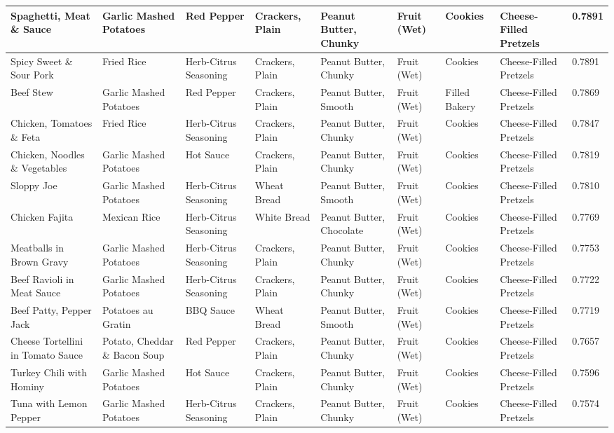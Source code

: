 \begin{landscape}
\begin{longtable}{p{3.0cm}p{3.7cm}p{2.2cm}p{2.0cm}p{2.3cm}p{0.8cm}p{1.5cm}p{2.2cm}p{0.8cm}}
\midrule
Spaghetti, Meat \& Sauce & Garlic Mashed Potatoes & Red Pepper & Crackers, Plain & Peanut Butter, Chunky & Fruit (Wet) & Cookies & Cheese-Filled Pretzels & 0.7891 \\
\midrule
Spicy Sweet \& Sour Pork & Fried Rice & Herb-Citrus Seasoning & Crackers, Plain & Peanut Butter, Chunky & Fruit (Wet) & Cookies & Cheese-Filled Pretzels & 0.7891\\
\midrule
Beef Stew & Garlic Mashed Potatoes & Red Pepper & Crackers, Plain & Peanut Butter, Smooth & Fruit (Wet) & Filled Bakery & Cheese-Filled Pretzels & 0.7869 \\
\midrule
Chicken, Tomatoes \& Feta & Fried Rice & Herb-Citrus Seasoning & Crackers, Plain & Peanut Butter, Chunky & Fruit (Wet) & Cookies & Cheese-Filled Pretzels & 0.7847 \\
\midrule
Chicken, Noodles \& Vegetables & Garlic Mashed Potatoes & Hot Sauce & Crackers, Plain & Peanut Butter, Chunky & Fruit (Wet) & Cookies & Cheese-Filled Pretzels & 0.7819 \\
\midrule
Sloppy Joe & Garlic Mashed Potatoes & Herb-Citrus Seasoning & Wheat Bread & Peanut Butter, Smooth & Fruit (Wet) & Cookies & Cheese-Filled Pretzels & 0.7810 \\
\midrule
Chicken Fajita & Mexican Rice & Herb-Citrus Seasoning & White Bread & Peanut Butter, Chocolate & Fruit (Wet) & Cookies & Cheese-Filled Pretzels & 0.7769 \\
\midrule
Meatballs in Brown Gravy & Garlic Mashed Potatoes & Herb-Citrus Seasoning & Crackers, Plain & Peanut Butter, Chunky & Fruit (Wet) & Cookies & Cheese-Filled Pretzels & 0.7753 \\
\midrule
Beef Ravioli in Meat Sauce & Garlic Mashed Potatoes & Herb-Citrus Seasoning & Crackers, Plain & Peanut Butter, Chunky & Fruit (Wet) & Cookies & Cheese-Filled Pretzels & 0.7722 \\
\midrule
Beef Patty, Pepper Jack & Potatoes au Gratin & BBQ Sauce & Wheat Bread & Peanut Butter, Smooth & Fruit (Wet) & Cookies & Cheese-Filled Pretzels & 0.7719 \\
\midrule
Cheese Tortellini in Tomato Sauce & Potato, Cheddar \& Bacon Soup & Red Pepper & Crackers, Plain & Peanut Butter, Chunky & Fruit (Wet) & Cookies & Cheese-Filled Pretzels & 0.7657 \\
\midrule
Turkey Chili with Hominy & Garlic Mashed Potatoes & Hot Sauce & Crackers, Plain & Peanut Butter, Chunky & Fruit (Wet) & Cookies & Cheese-Filled Pretzels & 0.7596 \\
\midrule
Tuna with Lemon Pepper & Garlic Mashed Potatoes & Herb-Citrus Seasoning & Crackers, Plain & Peanut Butter, Chunky & Fruit (Wet) & Cookies & Cheese-Filled Pretzels & 0.7574 \\

\end{longtable}
\end{landscape}
